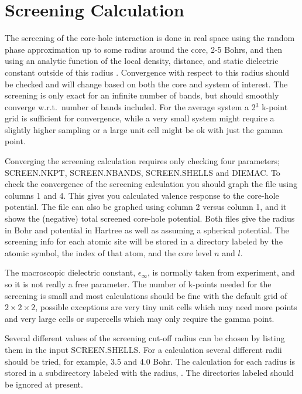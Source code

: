 \documentclass[11pt]{report}
\begin{document}
\chapter{Screening Calculation}
\label{screening}

The screening of the core-hole interaction is done in real space using the random phase approximation up to 
some radius around the core, 2-5 Bohrs, and then using an analytic function of the local density, distance, 
and static dielectric constant outside of this radius \cite{Shirley2006986}. Convergence with respect to this radius should be 
checked and will change based on both the core and system of interest. The screening is only exact for an 
infinite number of bands, but should smoothly converge w.r.t.\ number of bands included. For the average 
system a 2$^3$ k-point grid is sufficient for convergence, while a very small system might require a 
slightly higher sampling or a large unit cell might be ok with just the gamma point.

Converging the screening calculation requires only checking four parameters; SCREEN.NKPT, SCREEN.NBANDS, SCREEN.SHELLS and DIEMAC. To check the convergence of the screening calculation you should graph the file  using columns 1 and 4. This gives you calculated valence response to the core-hole potential. The file  can also be graphed using column 2 versus column 1, and it shows the (negative) total screened core-hole potential. Both files give the radius in Bohr and potential in Hartree as well as assuming a spherical potential. The screening info for each atomic site will be stored in a directory labeled by the atomic symbol, the index of that atom, and the core level $n$ and $l$.

The macroscopic dielectric constant, $\epsilon_\infty$, is normally taken from experiment, and so it is not really a free parameter. The number of k-points needed for the screening is small and most calculations should be fine with the default grid of $2\times2\times2$, possible exceptions are very tiny unit cells which may need more points and very large cells or supercells which may only require the gamma point. 

Several different values of the screening cut-off radius can be chosen by listing them in the input SCREEN.SHELLS. For a calculation several different radii should be tried, for example, 3.5 and 4.0 Bohr. The calculation for each radius is stored in a subdirectory labeled with the radius, . The directories labeled  should be ignored at present. 
\end{document}
